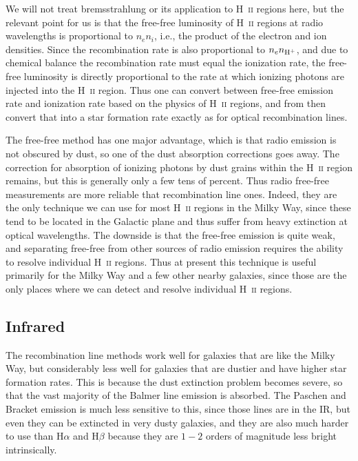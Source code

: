 We will not treat bremsstrahlung or its application to H~\textsc{ii} regions here, but the relevant point for us is that the free-free luminosity of H~\textsc{ii} regions at radio wavelengths is proportional to $n_e n_i$, i.e., the product of the electron and ion densities. Since the recombination rate is also proportional to $n_e n_{\rm H^+}$, and due to chemical balance the recombination rate must equal the ionization rate, the free-free luminosity is directly proportional to the rate at which ionizing photons are injected into the H~\textsc{ii} region. Thus one can convert between free-free emission rate and ionization rate based on the physics of H~\textsc{ii} regions, and from then convert that into a star formation rate exactly as for optical recombination lines.

The free-free method has one major advantage, which is that radio emission is not obscured by dust, so one of the dust absorption corrections goes away. The correction for absorption of ionizing photons by dust grains within the H~\textsc{ii} region remains, but this is generally only a few tens of percent. Thus radio free-free measurements are more reliable that recombination line ones. Indeed, they are the only technique we can use for most H~\textsc{ii} regions in the Milky Way, since these tend to be located in the Galactic plane and thus suffer from heavy extinction at optical wavelengths. The downside is that the free-free emission is quite weak, and separating free-free from other sources of radio emission requires the ability to resolve individual H~\textsc{ii} regions. Thus at present this technique is useful primarily for the Milky Way and a few other nearby galaxies, since those are the only places where we can detect and resolve individual H~\textsc{ii} regions.

\subsection{Infrared}

The recombination line methods work well for galaxies that are like the Milky Way, but considerably less well for galaxies that are dustier and have higher star formation rates. This is because the dust extinction problem becomes severe, so that the vast majority of the Balmer line emission is absorbed. The Paschen and Bracket emission is much less sensitive to this, since those lines are in the IR, but even they can be extincted in very dusty galaxies, and they are also much harder to use than H$\alpha$ and H$\beta$ because they are $1-2$ orders of magnitude less bright intrinsically.


